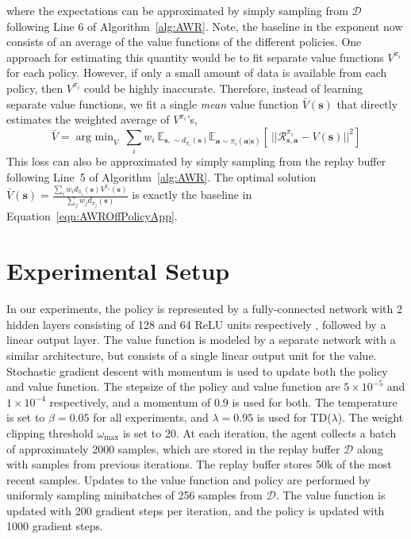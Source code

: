 \documentclass{article} \usepackage{iclr2020_conference,times}
\def\rva{{\mathbf{a}}}
\def\rvs{{\mathbf{s}}}
\newcommand{\weighti}{w_i}
\newcommand{\pii}{\pi_i}
\newcommand{\expec}{\mathbb{E}}
\begin{document}
where the expectations can be approximated by simply sampling from $\mathcal{D}$ following Line 6 of Algorithm~\ref{alg:AWR}. Note, the baseline in the exponent now consists of an average of the value functions of the different policies. One approach for estimating this quantity would be to fit separate value functions $V^{\pii}$ for each policy. However, if only a small amount of data is available from each policy, then $V^{\pii}$ could be highly inaccurate. Therefore, instead of learning separate value functions, we fit a single \emph{mean} value function $\bar{V}(\rvs)$ that directly estimates the weighted average of $V^{\pii}$'s,
\begin{equation}
\bar{V} = \mathop{\mathrm{arg \ min}}_{V} \  \sum_i \weighti \ \mathbb{E}_{\rvs, \sim d_{\pii}(\rvs)} \expec_{\rva \sim \pii(\rva | \rvs)} \left[ \ ||\mathcal{R}_{\rvs, \rva}^{\pi_i} - V(\rvs) ||^2 \right]
\end{equation}
This loss can also be approximated by simply sampling from the replay buffer following Line~5 of Algorithm~\ref{alg:AWR}. The optimal solution $\bar{V}(\rvs) = \frac{\sum_{i} \weighti d_{\pii}(\rvs) V^{\pii}(\rvs)}{\sum_j w_j d_{\pi_j}(\rvs)}$ is exactly the baseline in Equation~\ref{eqn:AWROffPolicyApp}.

\section{Experimental Setup}
\label{sec:ExpSetup}
In our experiments, the policy is represented by a fully-connected network with 2 hidden layers consisting of 128 and 64 ReLU units respectively \citep{NairRLU2010}, followed by a linear output layer. The value function is modeled by a separate network with a similar architecture, but consists of a single linear output unit for the value. Stochastic gradient descent with momentum is used to update both the policy and value function. The stepsize of the policy and value function are $5 \times 10^{-5}$ and $1 \times 10^{-4}$ respectively, and a momentum of 0.9 is used for both. The temperature is set to $\beta = 0.05$ for all experiments, and $\lambda = 0.95$ is used for TD($\lambda$). The weight clipping threshold $\omega_{\max}$ is set to 20. At each iteration, the agent collects a batch of approximately 2000 samples, which are stored in the replay buffer $\mathcal{D}$ along with samples from previous iterations. The replay buffer stores 50k of the most recent samples. Updates to the value function and policy are performed by uniformly sampling minibatches of 256 samples from $\mathcal{D}$. The value function is updated with 200 gradient steps per iteration, and the policy is updated with 1000 gradient steps.
\end{document}
